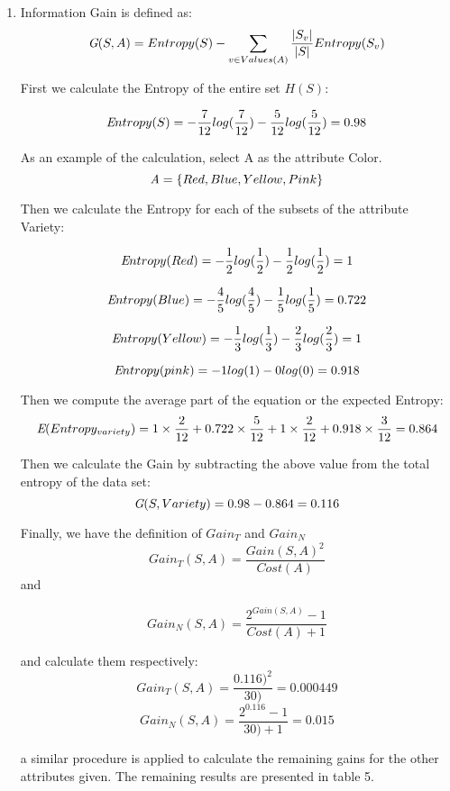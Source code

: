 \documentclass[11pt]{article}
\begin{document}
	\begin{enumerate}
		
		\item Information Gain is defined as: $$\textit G(S,A) = Entropy(S) - \sum_{v\in Values(A)} \frac{|S_v|}{|S|} Entropy(S_v)$$ 
		
		First we calculate the Entropy of the entire set $H(S)$:
		
		$$\textit Entropy(S) = - \frac{7}{12}log(\frac{7}{12}) - \frac{5}{12}  log(\frac{5}{12}) = 0.98$$
		
		As an example of the calculation, select A as the attribute Color.
		$$\textit A = \{Red,Blue,Yellow,Pink\}$$
		
		Then we calculate the Entropy for each of the subsets of the attribute Variety:
		
		$$\textit Entropy(Red) = - \frac{1}{2}log(\frac{1}{2}) - \frac{1}{2}  log(\frac{1}{2}) = 1$$
		
		$$\textit Entropy(Blue) = -\frac{4}{5}log(\frac{4}{5}) -\frac{1}{5} log(\frac{1}{5}) = 0.722$$
		
		$$\textit Entropy(Yellow) = - \frac{1}{3}log(\frac{1}{3}) - \frac{2}{3}  log(\frac{2}{3}) = 1$$
		
		$$\textit Entropy(pink) = -1log(1) - 0 log(0) = 0.918 $$
		
		Then we compute the average part of the equation or the expected Entropy:
		$$\textit E(Entropy_{variety}) = 1 \times \frac{2}{12} + 0.722\times \frac{5}{12} + 1 \times \frac{2}{12} + 0.918\times \frac{3}{12} = 0.864$$
		
		Then we calculate the Gain by subtracting the above value from the total entropy of the data set:
		$$\textit G(S,Variety) =  0.98 - 0.864 = 0.116 $$
		
		Finally, we have the definition of $Gain_T$ and $Gain_N$
				$$Gain_T(S,A) = \frac{Gain(S,A)^2}{Cost(A)} $$
		and

		\[Gain_N(S,A) = \frac{2^{Gain(S,A)} - 1}{Cost(A) + 1}\] 
		
		and calculate them respectively:
		$$Gain_T(S,A) = \frac{0.116)^2}{30)} = 0.000449 $$
		\[Gain_N(S,A) = \frac{2^{0.116} - 1}{30) + 1} = 0.015\]
			
		a similar procedure is applied to calculate the remaining gains for the other attributes given. The remaining results are presented in table 5.
		
		
		

\end{enumerate}
\end{document}

